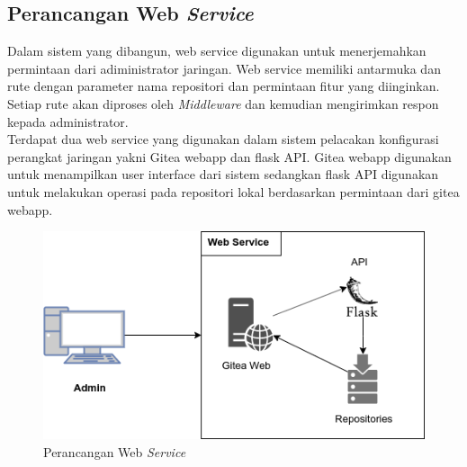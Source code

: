         
        \subsection{Perancangan Web \textit{Service}}
        	Dalam sistem yang dibangun, web service digunakan untuk menerjemahkan permintaan dari adiministrator jaringan. Web service memiliki antarmuka dan rute dengan parameter nama repositori dan permintaan fitur yang diinginkan. Setiap rute akan diproses oleh \textit{Middleware} dan kemudian mengirimkan respon kepada administrator.\\
        	\indent Terdapat dua web service yang digunakan dalam sistem pelacakan konfigurasi perangkat jaringan yakni Gitea webapp dan flask API. Gitea webapp digunakan untuk menampilkan user interface dari sistem sedangkan flask API digunakan untuk melakukan operasi pada repositori lokal berdasarkan permintaan dari gitea webapp. 
         	\begin{figure}[H]
         		\centering
         		\includegraphics[width=\textwidth]{Images/C-3/Web_Service.png}
         		\caption{Perancangan Web \textit{Service}}
         		\label{WebService}
         	\end{figure}
        
       
            
        